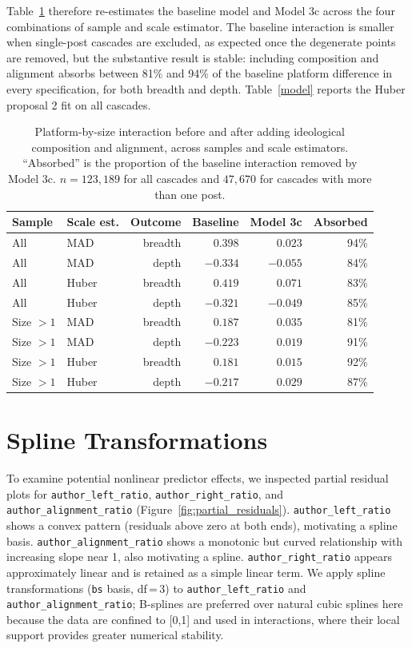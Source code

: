 \documentclass[letterpaper]{article} %
\newcommand{\rev}[1]{{\color{blue}#1}}
\begin{document}
\rev{Table~\ref{tab:specrob} therefore re-estimates the baseline model and Model 3c across the four combinations of sample and scale estimator. The baseline interaction is smaller when single-post cascades are excluded, as expected once the degenerate points are removed, but the substantive result is stable: including composition and alignment absorbs between 81\% and 94\% of the baseline platform difference in every specification, for both breadth and depth. Table~\ref{model} reports the Huber proposal 2 fit on all cascades.}

\begin{table}[t]
\centering
\footnotesize
\setlength{\tabcolsep}{4pt}
\rev{
\begin{tabular}{llrrrr}
\toprule
Sample & Scale est. & Outcome & Baseline & Model 3c & Absorbed \\
\midrule
All & MAD & breadth & $0.398$ & $0.023$ & 94\% \\
All & MAD & depth & $-0.334$ & $-0.055$ & 84\% \\
All & Huber & breadth & $0.419$ & $0.071$ & 83\% \\
All & Huber & depth & $-0.321$ & $-0.049$ & 85\% \\
Size $>1$ & MAD & breadth & $0.187$ & $0.035$ & 81\% \\
Size $>1$ & MAD & depth & $-0.223$ & $0.019$ & 91\% \\
Size $>1$ & Huber & breadth & $0.181$ & $0.015$ & 92\% \\
Size $>1$ & Huber & depth & $-0.217$ & $0.029$ & 87\% \\
\bottomrule
\end{tabular}
}
\caption{\rev{Platform-by-size interaction before and after adding ideological composition and alignment, across samples and scale estimators. ``Absorbed'' is the proportion of the baseline interaction removed by Model 3c. $n = 123{,}189$ for all cascades and $47{,}670$ for cascades with more than one post.}}
\label{tab:specrob}
\end{table}

\section{Spline Transformations}
\label{app:spline}
To examine potential nonlinear predictor effects, we inspected partial residual plots for \texttt{author\_left\_ratio}, \texttt{author\_right\_ratio}, and \texttt{author\_alignment\_ratio} (Figure~\ref{fig:partial_residuals}). \texttt{author\_left\_ratio} shows a convex pattern (residuals above zero at both ends), motivating a spline basis. \texttt{author\_alignment\_ratio} shows a monotonic but curved relationship with increasing slope near 1, also motivating a spline. \texttt{author\_right\_ratio} appears approximately linear and is retained as a simple linear term. We apply spline transformations (\texttt{bs} basis, df\,=\,3) to \texttt{author\_left\_ratio} and \texttt{author\_alignment\_ratio}; B-splines are preferred over natural cubic splines here because the data are confined to [0,1] and used in interactions, where their local support provides greater numerical stability.
\end{document}
